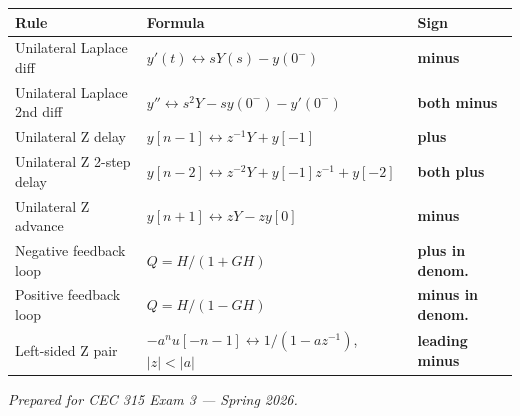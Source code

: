 \documentclass[11pt]{article}
\begin{document}
\begin{center}
\begin{tabular}{|l|l|l|}
\hline
\textbf{Rule} & \textbf{Formula} & \textbf{Sign} \\\hline
Unilateral Laplace diff & $y'(t) \leftrightarrow sY(s) - y(0^-)$ & \textbf{minus} \\
Unilateral Laplace 2nd diff & $y''\leftrightarrow s^2Y - sy(0^-) - y'(0^-)$ & \textbf{both minus} \\
Unilateral Z delay & $y[n-1] \leftrightarrow z^{-1}Y + y[-1]$ & \textbf{plus} \\
Unilateral Z 2-step delay & $y[n-2] \leftrightarrow z^{-2}Y + y[-1]z^{-1} + y[-2]$ & \textbf{both plus} \\
Unilateral Z advance & $y[n+1] \leftrightarrow zY - z y[0]$ & \textbf{minus} \\
Negative feedback loop & $Q = H/(1+GH)$ & \textbf{plus in denom.} \\
Positive feedback loop & $Q = H/(1-GH)$ & \textbf{minus in denom.} \\
Left-sided Z pair & $-a^n u[-n-1] \leftrightarrow 1/(1-az^{-1})$, $|z|<|a|$ & \textbf{leading minus} \\\hline
\end{tabular}
\end{center}

\vspace{1em}
\begin{center}\emph{Prepared for CEC 315 Exam 3 --- Spring 2026.}\end{center}
\end{document}
